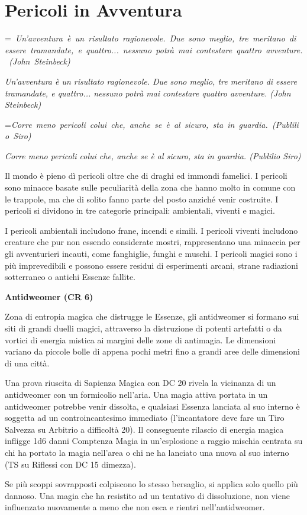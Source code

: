 \documentclass[a4paper,11pt,twoside,openany]{book}
\makeatletter
\newcommand{\mybox}[1]{%
	\setbox0=\hbox{#1}%
	\setlength{\@tempdima}{\dimexpr\wd0+13pt}%
	\begin{tcolorbox}[boxrule=0.5pt,arc=4pt, breakable,enhanced,
		left=6pt,right=6pt,top=6pt,bottom=6pt,boxsep=0pt,width=\@tempdima]
		#1
	\end{tcolorbox}
}
\makeatother
\begin{document}
{\pagebreak

\section{Pericoli in Avventura}


\mybox{\textit{
		{Un'avventura è un risultato ragionevole. Due sono meglio, tre meritano di essere tramandate, e quattro... nessuno potrà mai contestare quattro avventure. (John Steinbeck)}
}}\medskip


\label{pericoli-in-avventura}
\mybox{\textit{Corre meno pericoli colui che, anche se è al sicuro, sta in guardia. (Publilio Siro)
}}\medskip
Il mondo è pieno dì pericoli oltre che di draghi ed immondi famelici. I pericoli sono minacce basate sulle peculiarità della zona che hanno molto in comune con le trappole, ma che di solito fanno parte del posto anziché venir costruite. I pericoli si dividono in tre categorie principali: ambientali, viventi e magici.

I pericoli ambientali includono frane, incendi e simili. I pericoli viventi includono creature che pur non essendo considerate mostri, rappresentano una minaccia per gli av­venturieri incauti, come fanghiglie, funghi e muschi. I pericoli magici sono i più imprevedibili e possono essere residui di esperimenti arcani, strane radiazioni sotterraneo o antichi Essenze fallite.

\textbf{Antidweomer (CR 6)}

Zona di entropia magica che distrugge le Essenze, gli antidweomer si formano sui siti di grandi duelli magici, attraverso la distruzione di potenti artefatti o da vortici di energia mistica ai margini delle zone di antimagia. Le dimensioni variano da piccole bolle di appena pochi metri fino a grandi aree delle dimensioni di una città. 

Una prova riuscita di Sapienza Magica con DC 20 rivela la vicinanza di un antidweomer con un formicolio nell'aria. Una magia attiva portata in un antidweomer potrebbe venir dissolta, e qualsiasi Essenza lanciata al suo interno è soggetta ad un controincantesimo immediato (l'incantatore deve fare un Tiro Salvezza su Arbitrio a difficoltà 20). Il conseguente rilascio di energia magica infligge 1d6 danni Comptenza Magia in un'esplosione a raggio mischia centrata su chi ha portato la magia nell'area o chi ne ha lanciato una nuova al suo interno (TS su Riflessi con DC 15 dimezza).

Se più scoppi sovrapposti colpiscono lo stesso bersaglio, si applica solo quello più dannoso. Una magia che ha resistito ad un tentativo di dissoluzione, non viene influenzato nuovamente a meno che non esca e rientri nell'antidweomer.

}
\end{document}
